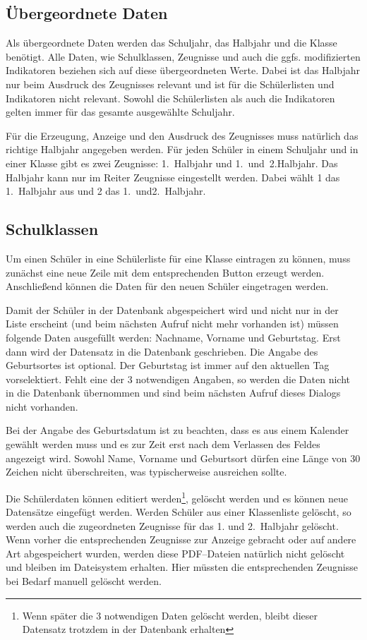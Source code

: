 \documentclass[a4paper,notitlepage,parskip]{scrartcl}
\newcommand\ott{\normalfont\ttfamily}
\begin{document}
\subsection{Übergeordnete Daten}
Als übergeordnete Daten werden das Schuljahr, das Halbjahr und die Klasse benötigt.
Alle Daten, wie Schulklassen, Zeugnisse und auch die ggfs. modifizierten Indikatoren beziehen sich auf diese übergeordneten Werte. Dabei ist das Halbjahr nur beim Ausdruck des Zeugnisses relevant und ist für die Schülerlisten und Indikatoren nicht relevant. Sowohl die Schülerlisten als auch die Indikatoren gelten immer für das gesamte ausgewählte Schuljahr.

Für die Erzeugung, Anzeige und den Ausdruck des Zeugnisses muss natürlich das richtige Halbjahr angegeben werden.
Für jeden Schüler in einem Schuljahr und in einer Klasse gibt es zwei Zeugnisse: 1.~Halbjahr und 1.~und~2.Halbjahr. Das Halbjahr kann nur im Reiter {\ott Zeugnisse} eingestellt werden. Dabei wählt 1 das 1.~Halbjahr aus und 2 das 1.~und2.~Halbjahr.

\subsection{Schulklassen}

Um einen Schüler in eine Schülerliste für eine Klasse eintragen zu können, muss zunächst eine neue Zeile mit dem entsprechenden Button erzeugt werden. Anschließend können die Daten für den neuen Schüler eingetragen werden. 

Damit der Schüler in der Datenbank abgespeichert wird und nicht nur in der Liste erscheint (und beim nächsten Aufruf nicht mehr vorhanden ist) müssen folgende Daten ausgefüllt werden: {\ott Nachname}, {\ott Vorname} und {\ott Geburtstag}. Erst dann wird der Datensatz in die Datenbank geschrieben. Die Angabe des Geburtsortes ist optional. Der {\ott Geburtstag} ist immer auf den aktuellen Tag vorselektiert.
Fehlt eine der 3 notwendigen Angaben, so werden die Daten nicht in die Datenbank übernommen und sind beim nächsten Aufruf dieses Dialogs nicht vorhanden.

Bei der Angabe des Geburtsdatum ist zu beachten, dass es aus einem Kalender gewählt werden muss und es zur Zeit erst nach dem Verlassen des Feldes angezeigt wird.
Sowohl Name, Vorname und Geburtsort dürfen eine Länge von 30 Zeichen nicht überschreiten, was typischerweise ausreichen sollte. 

Die Schülerdaten können editiert werden\footnote{Wenn später die 3 notwendigen Daten gelöscht werden, bleibt dieser Datensatz trotzdem in der Datenbank erhalten}, gelöscht werden und es können neue Datensätze eingefügt werden. Werden Schüler aus einer Klassenliste gelöscht, so werden auch die zugeordneten Zeugnisse für das 1. und 2.~Halbjahr gelöscht.
Wenn vorher die entsprechenden Zeugnisse zur Anzeige gebracht oder auf andere Art abgespeichert wurden, werden diese PDF--Dateien natürlich nicht gelöscht und bleiben im Dateisystem erhalten. Hier müssten die entsprechenden Zeugnisse bei Bedarf manuell gelöscht werden.
\end{document}
